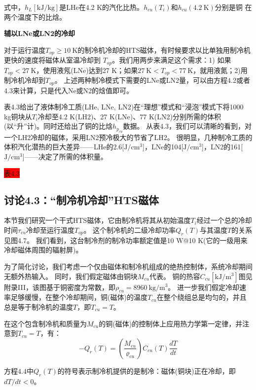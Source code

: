 式中，$h_L[\mathrm{kJ/kg}]$是LHe在4.2 K的汽化比热。$h_{cu}(T_i)$和$h_{cu}(4.2\ \mathrm{K})$分别是铜
在两个温度下的比焓。

\textbf{辅以LNe或LN2的冷却}

对于运行温度$T_{op}\ge 10\ \mathrm{K}$的制冷机冷却的HTS磁体，有时候要求以比单独用制冷机更快的速度将磁体从室温冷却到
$T_{op}$。我们用两步来满足这个需求：1) 如果$T_{op}<27\ \mathrm{K}$，使用液氖(LNe)达到27 K；如果$27\ \mathrm{K}<T_{op}<77\ \mathrm{K}$，就用液氮；2)用制冷机冷却到$T_{op}$。
上述两种制冷模式下需要的LNe或LN2量，可以由方程4.2或者4.3来计算，只是代入Ne或N2的焓值即可。

表4.3给出了液体制冷工质(LHe, LNe, LN2)在“理想”模式和“浸泡”模式下将1000 kg铜块从$T_i$冷却至4.2 K(LH2)、27 K(LNe)、77 K(LN2)分别所需的体积(以“升”计)。同时还给出了铜的比焓$h_{p_{cu}}$数据。
从表4.3，我们可以清晰的看到，对一个LH2冷却的磁体，采用LN2预冷极大的节省了LH2。
很明显，几种制冷工质的体积汽化潜热的巨大差异——LHe的2.6[$\mathrm{J/cm^3}$]，LNe的104[$\mathrm{J/cm^3}$]，LN2的161[$\mathrm{J/cm^3}$]——决定了所需的体积量。

\colorbox{red}{表4.3}



\subsection{讨论4.3：“制冷机冷却”HTS磁体}
本节我们研究一个干式HTS磁体，它由制冷机将其从初始温度$T_i$经过一个总的冷却时间$\tau_{cu}$冷却至运行温度$T_{op}$。
这个制冷机的二级冷却功率$Q_r(T)$与其温度$T$的关系见图4.7。
我们看到，这台制冷剂的制冷功率额定值是10 W@10 K(它的一级用来冷却磁体周围的辐射屏)。

为了简化讨论，我们考虑一个仅由磁体和制冷机组成的绝热控制体，系统冷却期间无额外热输入。
同时，我们假定磁体由铜块$M_{cu}$代表。
铜的热容$C_{cu}[\mathrm{kJ/m^3}]$图见附录III，该图基于铜密度为常数，即$\rho_{cu}=8960\ \mathrm{kg/m^3}$。
进一步我们假定冷却速率足够缓慢，在整个冷却期间，铜(磁体)的温度$T_{cu}$在整个绕组总是均匀的，并且总是等于制冷机的温度$T$，即$T_{cu}=T$。

在这个包含制冷机和质量为$M_{cu}$的铜(磁体)的控制体上应用热力学第一定律，并注意到$T_{cu}=T$，有：
\begin{equation}%
-Q_r(T)=\left(\frac{M_{cu}}{\varrho_{cu}}\right)C_{cu}(T)\frac{dT}{dt}
\end{equation}

方程4.4中$Q_r(T)$的符号表示制冷机提供的是制冷：磁体(铜块)正在冷却，即$dT/dt<0$。


